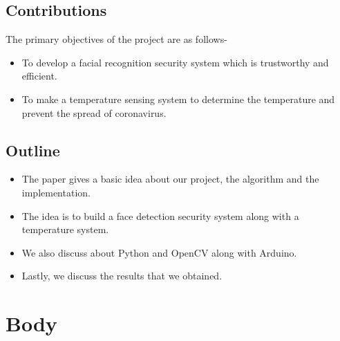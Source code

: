 \documentclass[conference]{IEEEtran}
\begin{document}
	\subsection{Contributions}
	The primary objectives of the project are as follows-
	\begin{itemize}
		\item To develop a facial recognition security system
		which is trustworthy and efficient.
		\item To make a temperature sensing system to determine
		the temperature and prevent the spread of
		coronavirus.
	\end{itemize}
	\subsection{Outline}
	\begin{itemize}
		\item The paper gives a basic idea about our project, the
		algorithm and the implementation.
		\item The idea is to build a face detection security system
		along with a temperature system.
		\item We also discuss about Python and OpenCV along
		with Arduino.
		\item Lastly, we discuss the results that we obtained.
	\end{itemize}
	
	\section{Body}
\end{document}

